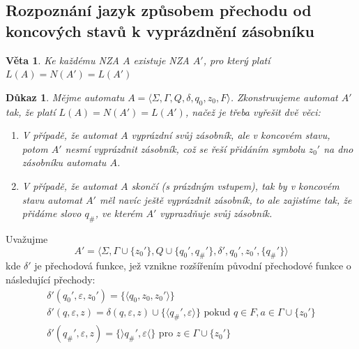 \documentclass[10pt, a4paper, titlepage]{article}
\theoremstyle{note}
\newtheorem{dukaz}{Důkaz}
\newtheorem{veta}{Věta}
\begin{document}
\subsection{Rozpoznání jazyk způsobem přechodu od koncových stavů k vyprázdnění zásobníku}
\begin{veta}
Ke každému NZA $A$ existuje NZA $A'$, pro který platí $L(A) = N(A') = L(A')$
\end{veta}
\begin{dukaz}
Mějme automatu $A = \langle \Sigma, \Gamma, Q, \delta, q_0, z_0, F \rangle$. Zkonstruujeme automat $A'$ tak, že
platí $L(A) = N(A') = L(A')$, načež je třeba vyřešit dvě věci:
\begin{enumerate}
\item
V případě, že automat $A$ vyprázdní svůj zásobník, ale v koncovém stavu, potom $A'$ nesmí vyprázdnit zásobník, což se řeší
přidáním symbolu $z_0'$ na dno zásobníku automatu $A$.

\item
V případě, že automat $A$ skončí (s prázdným vstupem), tak by v koncovém stavu automat $A'$ měl navíc ještě vyprázdnit
zásobník, to ale zajistíme tak, že přidáme slovo $q_\#$, ve kterém $A'$ vyprazdňuje svůj zásobník.
\end{enumerate} 
\end{dukaz}

Uvažujme
$$
A' = \langle \Sigma, \Gamma \cup \lbrace z_{0}' \rbrace, Q \cup \lbrace q_{0}', q_{\#}' \rbrace, \delta',
q_0', z_0', \lbrace q_{\#}' \rbrace \rangle
$$
kde $\delta'$ je přechodová funkce, jež vznikne rozšířením původní přechodové funkce o následující přechody:
\begin{gather*}
\delta'(q_0', \varepsilon, z_0') = \lbrace \langle q_0, z_0, z_0' \rangle \rbrace \\
\delta'(q, \varepsilon, z) = \delta(q, \varepsilon, z) \cup \lbrace \langle q_{\#}', \varepsilon \rangle \rbrace \text { pokud }
q \in F, a \in \Gamma \cup \lbrace z_0' \rbrace \\
\delta'(q_{\#}', \varepsilon, z) = \lbrace \rangle q_{\#}', \varepsilon \langle \rbrace \text{ pro } z \in \Gamma \cup \lbrace z_0' \rbrace
\end{gather*}
\end{document}
